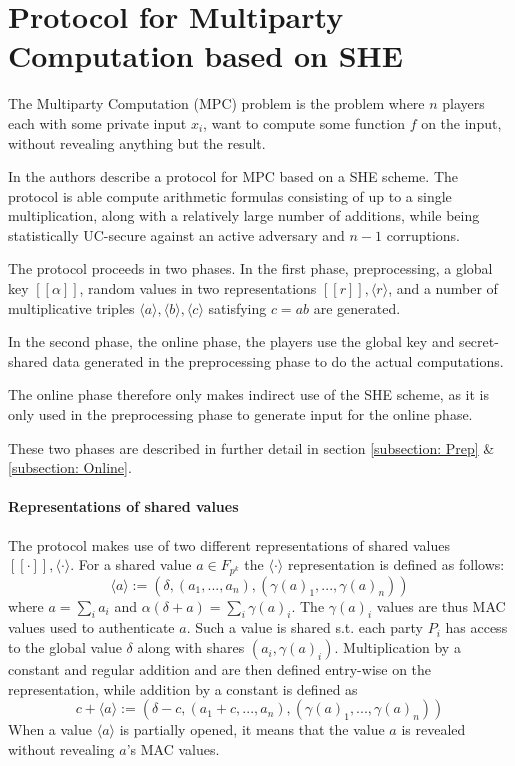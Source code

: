 \documentclass[../main.tex]{subfiles}
\begin{document}
\section{Protocol for Multiparty Computation based on SHE} \label{section: MPC scheme}
The Multiparty Computation (MPC) problem is the problem where $n$ players each with some private input $x_i$, want to compute some function $f$ on the input, without revealing anything but the result.

In \cite{damgaard2012multiparty} the authors describe a protocol for MPC based on a SHE scheme. The protocol is able compute arithmetic formulas consisting of up to a single multiplication, along with a relatively large number of additions, while being statistically UC-secure against an active adversary and $n - 1$ corruptions.

The protocol proceeds in two phases. In the first phase, preprocessing, a global key $[\![\alpha]\!]$, random values in two representations $[\![r]\!], \langle r \rangle$, and a number of multiplicative triples $\langle a \rangle, \langle b \rangle, \langle c \rangle$ satisfying $c = ab$ are generated.

In the second phase, the online phase, the players use the global key and secret-shared data generated in the preprocessing phase to do the actual computations.

The online phase therefore only makes indirect use of the SHE scheme, as it is only used in the preprocessing phase to generate input for the online phase.

These two phases are described in further detail in section \ref{subsection: Prep} \& \ref{subsection: Online}.

\paragraph{Representations of shared values}
The protocol makes use of two different representations of shared values $[\![ \cdot ]\!], \langle \cdot \rangle$. For a shared value $a \in F_{p^k}$ the $\langle \cdot \rangle$ representation is defined as follows:
$$\langle a \rangle := (\delta, (a_1, ..., a_n), (\gamma(a)_1, ..., \gamma(a)_n))$$
where $a = \sum_i a_i$ and $\alpha (\delta + a) = \sum_i \gamma(a)_i$. The $\gamma(a)_i$ values are thus MAC values used to authenticate $a$. Such a value is shared s.t. each party $P_i$ has access to the global value $\delta$ along with shares $(a_i, \gamma(a)_i)$. Multiplication by a constant and regular addition and  are then defined entry-wise on the representation, while addition by a constant is defined as $$c + \langle a \rangle := (\delta - c, (a_1 + c, ..., a_n), (\gamma(a)_1, ..., \gamma(a)_n))$$
When a value $\langle a \rangle$ is partially opened, it means that the value $a$ is revealed without revealing $a$'s MAC values.
\end{document}
